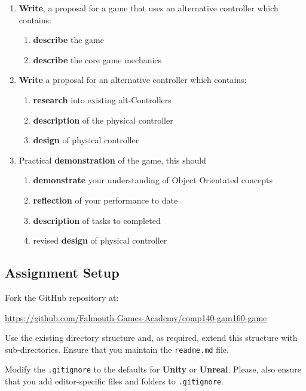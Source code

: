 \documentclass{../fal_assignment}
\begin{document}
	\begin{enumerate}[label=(\Alph*)]
		\item \textbf{Write}, a proposal for a game that uses an alternative controller which contains:
		\begin{enumerate}[label=\roman*.]
			\item \textbf{describe} the game
			\item \textbf{describe} the core game mechanics
		\end{enumerate}
		\item \textbf{Write} a proposal for an alternative controller which contains: 
		\begin{enumerate}[label=\roman*.]
			\item \textbf{research} into existing alt-Controllers
			\item \textbf{description} of the physical controller
			\item \textbf{design} of physical controller
		\end{enumerate}
		\item Practical \textbf{demonstration} of the game, this should
		\begin{enumerate}[label=\roman*.]
			\item \textbf{demonstrate} your understanding of Object Orientated concepts
			\item \textbf{reflection} of your performance to date
			\item \textbf{description} of tasks to completed
			\item revised \textbf{design} of physical controller
		\end{enumerate}
	\end{enumerate}
	
	\subsection*{Assignment Setup}
	
	Fork the GitHub repository at:
	
	\indent \url{https://github.com/Falmouth-Games-Academy/comp140-gam160-game}
	
	Use the existing directory structure and, as required, extend this structure with sub-directories. Ensure that you maintain the \texttt{readme.md} file.
	
	Modify the \texttt{.gitignore} to the defaults for \textbf{Unity} or \textbf{Unreal}. Please, also ensure that you add editor-specific files and folders to \texttt{.gitignore}. 
	
\end{document}
